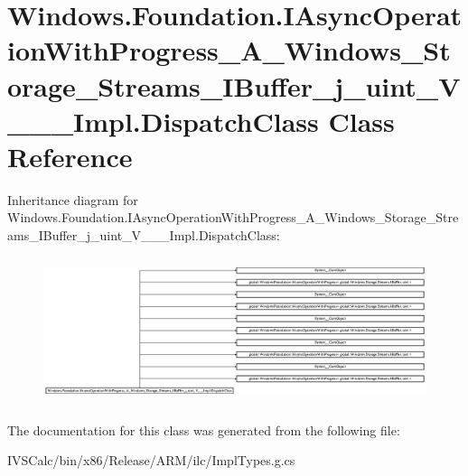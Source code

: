 \hypertarget{class_windows_1_1_foundation_1_1_i_async_operation_with_progress___a___windows___storage___strea19dc48da6402b5b8bdcc5b92597c1472}{}\section{Windows.\+Foundation.\+I\+Async\+Operation\+With\+Progress\+\_\+\+A\+\_\+\+Windows\+\_\+\+Storage\+\_\+\+Streams\+\_\+\+I\+Buffer\+\_\+j\+\_\+uint\+\_\+\+V\+\_\+\+\_\+\+\_\+\+Impl.\+Dispatch\+Class Class Reference}
\label{class_windows_1_1_foundation_1_1_i_async_operation_with_progress___a___windows___storage___strea19dc48da6402b5b8bdcc5b92597c1472}
Inheritance diagram for Windows.\+Foundation.\+I\+Async\+Operation\+With\+Progress\+\_\+\+A\+\_\+\+Windows\+\_\+\+Storage\+\_\+\+Streams\+\_\+\+I\+Buffer\+\_\+j\+\_\+uint\+\_\+\+V\+\_\+\+\_\+\+\_\+\+Impl.\+Dispatch\+Class\+:\begin{figure}[H]
\begin{center}
\leavevmode
\includegraphics[height=4.325843cm]{class_windows_1_1_foundation_1_1_i_async_operation_with_progress___a___windows___storage___strea19dc48da6402b5b8bdcc5b92597c1472}
\end{center}
\end{figure}


The documentation for this class was generated from the following file\+:\begin{DoxyCompactItemize}
\item 
I\+V\+S\+Calc/bin/x86/\+Release/\+A\+R\+M/ilc/Impl\+Types.\+g.\+cs\end{DoxyCompactItemize}
